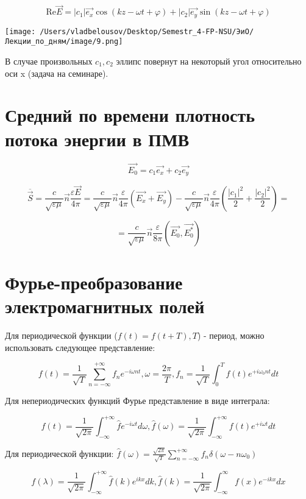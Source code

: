 \documentclass[12pt, a4paper]{report}
\begin{document}
\[ \mathrm{Re}\vec{E }= |c_1|\vec{e_x}\cos ( kz - \omega t + \varphi)  + |c_2|\vec{e_y}\sin( kz - \omega t + \varphi)   \] 

\begin{center}
    \texttt{[image: /Users/vladbelousov/Desktop/Semestr\_4-FP-NSU/ЭиО/Лекции\_по\_дням/image/9.png]}
\end{center}


В случае произвольных  \( c_1, c_2 \)  эллипс повернут на некоторый угол относительно оси x (задача на семинаре).

\section{Средний по времени плотность  потока энергии в ПМВ}

\[ \vec{E_0}= c_1\vec{e_x}+ c_2 \vec{e_y} \] 

\[ \overline{\vec{S}} = \frac{c}{\sqrt{\varepsilon \mu}} \vec{n} \frac{\varepsilon\vec{E}}{4 \pi} = \frac{c}{\sqrt{\varepsilon \mu}} \vec{n} \frac{\varepsilon}{4 \pi} (\vec{E_x}+ \vec{E_y} )-\frac{c}{\sqrt{\varepsilon \mu}}\vec{n} \frac{\varepsilon}{4 \pi}( \frac{|c_1| ^2}{2}+ \frac{|c_2| ^2}{2} )  =  \] 

\[ = \frac{c}{\sqrt{\varepsilon \mu}} \vec{n} \frac{\varepsilon}{8 \pi} ( \vec{E_0}, \vec{E_0^*} )  \] 

\section{Фурье-преобразование электромагнитных полей}

Для периодической функции (\( f(t)= f(t+T) ,T\)) - период, можно использовать следующее представление: 

\[ f(t)= \frac{1}{\sqrt{T}} \sum_{n=- \infty }^{+ \infty }f_n e^{- i \omega nt } , \omega = \frac{2 \pi}{T}, f_n = \frac{1}{\sqrt{T}}  \int_{0}^{T}f(t)e^{+i \omega_0 nt} dt      \] 


Для непериодических функций Фурье представление в виде интеграла: 

\[ f(t)= \frac{1}{\sqrt{2 \pi}} \int_{-\infty }^{+\infty} \hat{f}e^{-i \omega t}d \omega, \hat{f}( \omega)= \frac{1}{\sqrt{2 \pi}} \int_{-\infty }^{+\infty}    f(t) e^{+i \omega t}dt     \] 

Для периодической функции: \( \hat{f}( \omega)= \frac{\sqrt{2\pi}}{\sqrt{T}} \sum ^{+\infty }_{n = - \infty } f_n \delta( \omega- n \omega_0)     \) 

\[ f(\lambda)= \frac{1}{\sqrt{2 \pi}}\int _{-\infty }^{+\infty} \hat{f}(k)e^{i k x }d k  , \hat{f}(k)= \frac{1}{\sqrt{2 \pi}} \int_{-\infty}^{\infty} f(x)e^{- ikx} dx    \] 
\end{document}
